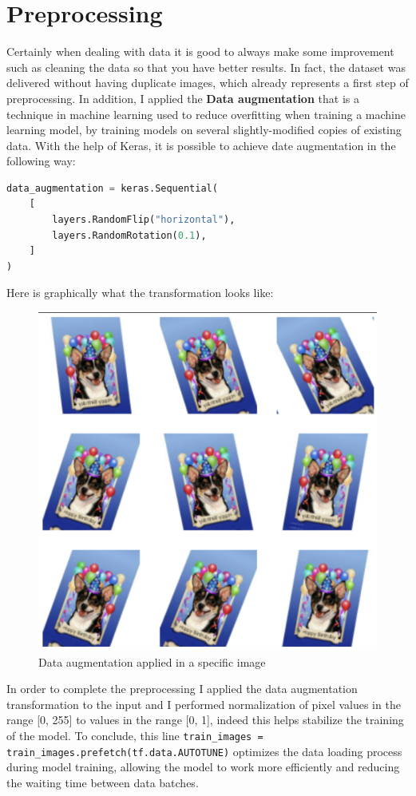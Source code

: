 \section{Preprocessing}
Certainly when dealing with data it is good to always make some improvement such as cleaning the data so that you have better results. In fact, the dataset was delivered without having duplicate images, which already represents a first step of preprocessing. In addition, I applied the \textbf{Data augmentation} \cite{dataaug} that is a technique in machine learning used to reduce overfitting when training a machine learning model, by training models on several slightly-modified copies of existing data.
With the help of Keras, it is possible to achieve date augmentation in the following way:
\begin{lstlisting}[language=Python]
data_augmentation = keras.Sequential(
    [
        layers.RandomFlip("horizontal"),
        layers.RandomRotation(0.1),
    ]
)
\end{lstlisting}
Here is graphically what the transformation looks like:
\begin{figure}[hbtp]
\caption{Data augmentation applied in a specific image}
\centering
\includegraphics[scale=0.5]{../Images/dataaug.png}
\end{figure}
In order to complete the preprocessing I applied the data augmentation transformation to the input and I performed normalization of pixel values in the range [0, 255] to values in the range [0, 1], indeed this helps stabilize the training of the model. To conclude, this line 
\texttt{train\_images = train\_images.prefetch(tf.data.AUTOTUNE)} optimizes the data loading process during model training, allowing the model to work more efficiently and reducing the waiting time between data batches.

